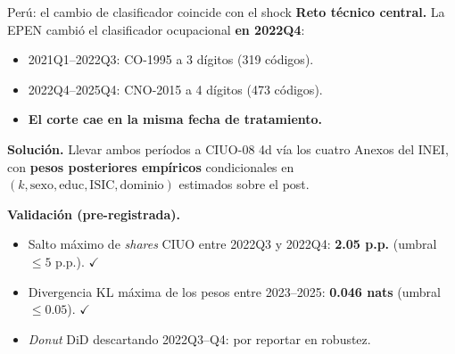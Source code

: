 \documentclass[aspectratio=169,11pt]{beamer}
\begin{document}
\begin{frame}{Perú: el cambio de clasificador coincide con el shock}
\small
\vspace{0.1em}
\textbf{Reto técnico central.} La EPEN cambió el clasificador ocupacional \textbf{en 2022Q4}:
\begin{itemize}
  \item 2021Q1--2022Q3: CO-1995 a 3 dígitos (319 códigos).
  \item 2022Q4--2025Q4: CNO-2015 a 4 dígitos (473 códigos).
  \item \textbf{El corte cae en la misma fecha de tratamiento.}
\end{itemize}

\vspace{0.4em}
\textbf{Solución.} Llevar ambos períodos a CIUO-08 4d vía los cuatro Anexos del INEI, con \textbf{pesos posteriores empíricos} condicionales en $(k, \text{sexo}, \text{educ}, \text{ISIC}, \text{dominio})$ estimados sobre el post.

\vspace{0.4em}
\textbf{Validación (pre-registrada).}
\begin{itemize}
  \item Salto máximo de \emph{shares} CIUO entre 2022Q3 y 2022Q4: \textbf{2.05 p.p.} (umbral $\leq 5$ p.p.). $\checkmark$
  \item Divergencia KL máxima de los pesos entre 2023--2025: \textbf{0.046 nats} (umbral $\leq 0.05$). $\checkmark$
  \item \emph{Donut} DiD descartando 2022Q3--Q4: por reportar en robustez.
\end{itemize}
\end{frame}
\end{document}
